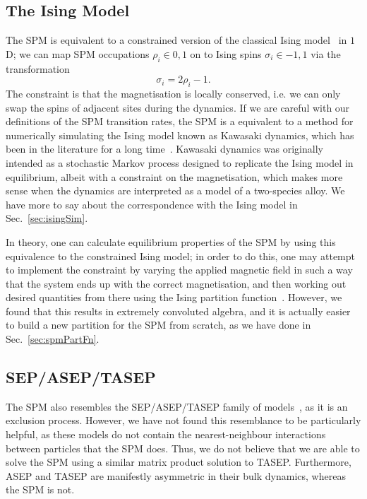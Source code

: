 \subsection{The Ising Model}
The SPM is equivalent to a constrained version of the classical Ising 
model~\cite{lenz1920, Ising1925, strecka2015} in $1$D; we can map SPM
occupations $\rho_i \in {0, 1}$ on to Ising spins $\sigma_i \in {-1, 1}$ via the transformation
\begin{equation}
 \sigma_i = 2 \rho_i - 1 .
\end{equation}
The constraint is that the magnetisation is locally conserved, i.e. we can only swap the spins of adjacent
sites during the dynamics. If we are careful with our definitions of the SPM transition rates,
the SPM is a equivalent to a method for numerically simulating the Ising model known as Kawasaki
dynamics, which has been in the literature for a long time~\cite{kawasaki1966, Garrido1990, grynberg2010}. 
Kawasaki dynamics was originally intended as
a stochastic Markov process designed to replicate the Ising model in equilibrium, albeit with a
constraint on the magnetisation, which makes more sense when the
dynamics are interpreted as a model of a two-species alloy. We have more 
to say about the correspondence with the Ising model in Sec.~\ref{sec:isingSim}.

In theory, one can calculate equilibrium properties of the SPM by using this equivalence to the constrained
Ising model; in order to do this, one may attempt to implement the constraint by varying the applied
magnetic field in such a way that the system ends up with the correct magnetisation, and then working
out desired quantities from there using the Ising partition function~\cite{baxter2016}. However, we found that
this results
in extremely convoluted algebra, and it is actually easier to build a new partition for the SPM from 
scratch, as we have done in Sec.~\ref{sec:spmPartFn}.
\subsection{SEP/ASEP/TASEP} \label{sec:asep}
The SPM also resembles the SEP/ASEP/TASEP family of models~\cite{liggett1985, golinelli2006, blythe2007,
Crampe2014}, 
as it is an
exclusion process. However, we 
have not found this resemblance to be particularly helpful, as these models do not contain the
nearest-neighbour interactions between particles that the SPM does. Thus, we do not believe that we are
able to solve the SPM using a similar matrix product solution to TASEP. Furthermore, ASEP and TASEP
are manifestly asymmetric in their bulk dynamics, whereas the SPM is not.

